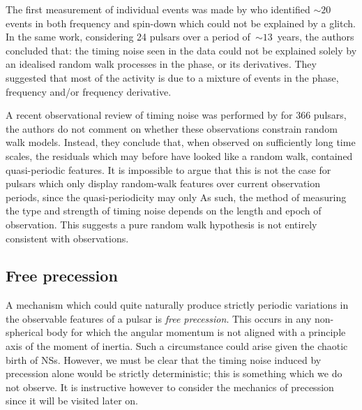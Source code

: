 The first measurement of individual events was made by \citet{Cordes1985} who
identified $\sim20$ events in both frequency and spin-down which could not be
explained by a glitch. In the same work, considering 24 pulsars over a period
of~$\sim13$~years, the authors concluded that: the timing noise seen in the
data could not be explained solely by an idealised random walk processes in the
phase, or its derivatives. They suggested that most of the activity is due to a
mixture of events in the phase, frequency and/or frequency derivative.

A recent observational review of timing noise was performed by
\citet{Hobbs2010} for 366 pulsars, the authors do not comment on whether these
observations constrain random walk models. Instead, they conclude that, when
observed on sufficiently long time scales, the residuals which may before have
looked like a random walk, contained quasi-periodic features. It is impossible
to argue that this is not the case for pulsars which only display random-walk
features over current observation periods, since the quasi-periodicity may only
As such, the method of measuring the type and strength of timing noise depends
on the length and epoch of observation. This suggests a pure random walk
hypothesis is not entirely consistent with observations.

\subsection{Free precession}
\label{sec: free precession}

A mechanism which could quite naturally produce strictly periodic variations in the
observable features of a pulsar is \emph{free precession}. This occurs in any
non-spherical body for which the angular momentum is not aligned with a principle
axis of the moment of inertia. Such a circumstance could arise given the
chaotic birth of NSs. However, we must be clear that the timing noise induced by
precession alone would be strictly deterministic; this is something which we do
not observe.
It is instructive however to consider the mechanics of precession since it will
be visited later on.

